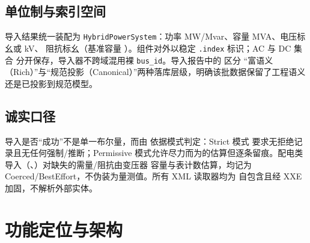 \documentclass[UTF8,fontset=fandol,a4paper,11pt]{ctexart}
\begin{document}
\subsection{单位制与索引空间}
导入结果统一装配为 \texttt{HybridPowerSystem}：功率 MW/Mvar、容量 MVA、电压标幺或 kV、
阻抗标幺（基准容量 ）。组件对外以稳定 \texttt{.index} 标识；AC 与 DC 集合
分开保存，导入器不跨域混用裸 \texttt{bus\_id}。导入报告中的  区分
“富语义（Rich）”与“规范投影（Canonical）”两种落库层级，明确该批数据保留了工程语义
还是已投影到规范模型。

\subsection{诚实口径}
导入是否“成功”不是单一布尔量，而由  依据模式判定：Strict 模式
要求无拒绝记录且无任何强制/推断；Permissive 模式允许尽力而为的估算但逐条留痕。配电类
导入（、）对缺失的需量/阻抗由变压器
容量与表计数估算，均记为 Coerced/BestEffort，不伪装为量测值。所有 XML 读取器均为
自包含且经 XXE 加固，不解析外部实体。

\section{功能定位与架构}
\end{document}
